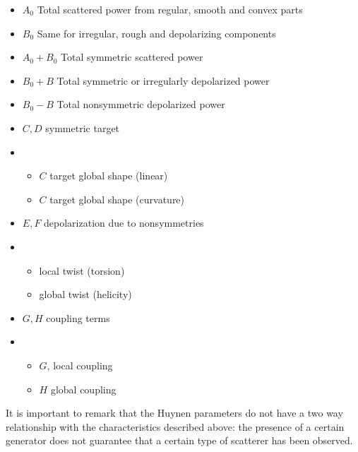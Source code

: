 \documentclass[11pt]{article}
\begin{document}
\begin{itemize}
	\item $A_{0}$ Total scattered power from regular, smooth and convex parts
	\item $B_{0}$ Same for irregular, rough and depolarizing components
	\item $A_{0} + B_{0}$ Total symmetric scattered power
	\item $B_{0} + B$ Total symmetric or irregularly depolarized power
	\item $B_{0} - B$ Total nonsymmetric depolarized power
	\item $C, D$ symmetric target
	\item 
		\begin{itemize}
			\item $C$ target global shape (linear)
			\item $C$ target global shape (curvature)
		\end{itemize} 
	\item $E,F$ depolarization due to nonsymmetries
	\item
		\begin{itemize}
			\item local twist (torsion)
			\item global twist (helicity)
		\end{itemize}
	\item $G,H$ coupling terms
	\item
		\begin{itemize}
			\item $G$, local coupling
			\item $H$ global coupling
		\end{itemize}
\end{itemize}
It is important to remark that the Huynen parameters do not have a two way relationship with the characteristics described above: the presence of a certain generator does not guarantee that a certain type of scatterer has been observed.
\end{document}
